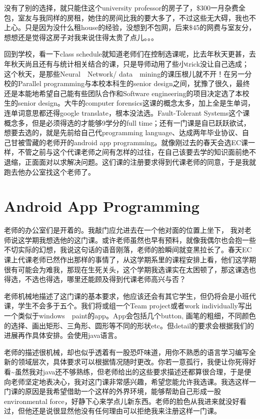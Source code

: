 \documentclass[12pt]{book}
\begin{document}
没有了别的选择，就只能住这个university professor的房子了，\$300一月杂费全包，室友与我同样的房租，她住的房间比我的要大多了，不过这些无大碍，我也不上心。只是因为没什么租house的经验，没想到不包网，后来\$45的网费与室友分，想想还是觉得这房子对我来说住得太贵了点儿。。。

回到学校，看一下class schedule就知道老师们在控制选课呢，比去年秋天更甚，去年秋天尚且还有与统计相关结合的课，只是导师动用了些小trick没让自己选成；这个秋天，是那些Neural　Network/ data　mining的课压根儿就不开！在另一分校的Parallel programming与本校本科生的senior design之间，犹豫了很久，最终还是本能地希望自己能有些团队合作和Software engineering的项目决定选了本校生的senior design。大牛的computer forensics这课的概念太多，加上全是生单词，连单词意思都还得google translate，根本没法选。Fault-Tolerant Systems这个课概念多，但是必须得选的才能够9学分的full time；还有一门课是自已跃跃欲试，想要去选的，就是先前给自己代programming language、达成两年毕业协议、自己甘被雪藏的老师开的android app programming。就像刚过去的春天会选EC课一样，不管之前与这个代课老师之间有怎样的过往，在自己该要去学的知识面前绝不退缩，正面面对以求解决问题。这们课的注册要求得到代课老师的同意，于是我就跑去他办公室找这个老师了。

\chapter{Android App Programming}
\label{sec-8}
老师的办公室们是开着的。我敲门应允进去在一个他对面的位置上坐下， 我对老师说这学期我想选他的这门课。或许老师虽然也早有预料，就像我偶尔也会抱一些不切实际的幻想，我说这句话的语音刚落，老师的脸瞬间就变黑拉长了。春天EC课上代课老师已然作出那样的事情了，从这学期系里的课程安排上看，他们这学期很有可能会为难我，那现在生死关头，这个学期我选课实在太困顿了，那这课选也得选，不选也得选，哪里还能顾及得到代课老师高兴与否？

老师机械地描述了这门课的基本要求，他应该还会有其它学生，但仍将会是小班代课，学生不会多于五个。我们将或组一个Team project或者work individually写出一个类似于windows　paint的app。App会包括几个button, 画笔的粗细，不同颜色的选择、画出矩形、三角形、圆形等不同的形状etc。但detail的要求会根据我们的进展再作具体安排。会使用java语言。

老师的描述很机械，却也似乎透着有一股恐吓味道，用你不熟悉的语言学习编写全新的领域层次，具体要求可以根据情况随时更改。你若一意孤行，我便让你死得好看\textasciitilde{}虽然我对java还不够熟练，但老师给出的这些要求描述还都算很合理，于是便向老师坚定地表决心，我对这门课非常感兴趣，希望您能允许我选课。我选这样一门课的原因是我希望借助一个这样的外界环境，能够帮助自己形成一股environmental force，好静下心来学点儿新东西。老师的脸色从我进来就没好看过，但他还是说很显然他没有任何理由可以拒绝我来注册这样一门课。
\end{document}

